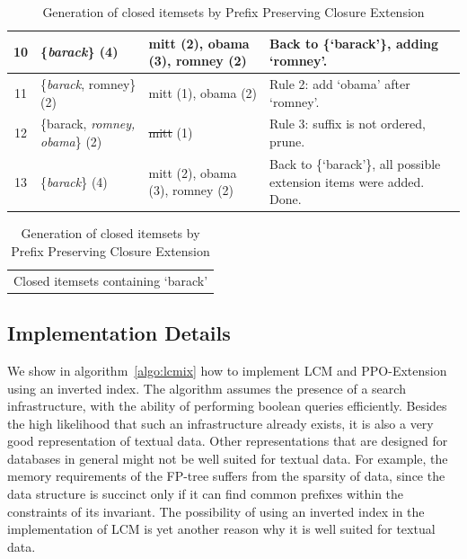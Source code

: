 \documentclass[letterpaper,12pt,titlepage,oneside,final]{book}
\begin{document}
\begin{landscape}
\begin{table}
\begin{tabular}{|c|p{6.5cm}|p{6.2cm}|p{7.6cm}|}
10 & \{\emph{barack}\} (4) & mitt (2), obama (3), \textbf{romney} (2) & Back to \{`barack'\}, adding `romney'. \\\hline
11 & \{\emph{barack}, romney\} (2) &  mitt (1), obama (2) & Rule 2: add `obama' after `romney'. \\\hline
12 & \{barack, \emph{romney, obama}\} (2) &  \sout{mitt} (1)  & Rule 3: suffix is not ordered, prune. \\\hline
13 & \{\emph{barack}\} (4) & mitt (2), obama (3), romney (2) & Back to \{`barack'\}, all possible extension items were added. Done. \\\hline
\end{tabular}
\begin{tabular}{c}
Closed itemsets containing `barack'
\end{tabular}
\caption{Generation of closed itemsets by Prefix Preserving Closure Extension}
\label{table:PPCExample}
\end{table}
\end{landscape}

\subsection{Implementation Details}
We show in algorithm~\ref{algo:lcmix} how to implement LCM and PPO-Extension
using an inverted index.
The algorithm assumes the presence of a search infrastructure,
with the ability of performing boolean queries efficiently.
Besides the high likelihood that such an infrastructure already exists,
it is also a very good representation of textual data.
Other representations that are designed for databases in general
might not be well suited for textual data. %
For example, the memory requirements of the FP-tree suffers from the sparsity
of data, since the data structure is succinct only if it can find common
prefixes within the constraints of its invariant. 
The possibility of using an inverted index in the implementation 
of LCM is yet another reason why it is well suited 
for textual data.
\end{document}
